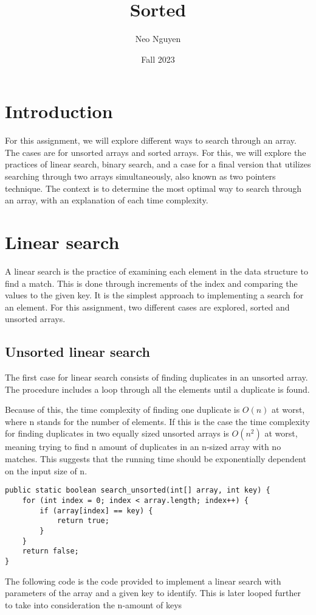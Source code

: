 \documentclass[a4paper,11pt]{article}
\begin{document}
\title{
    \textbf{Sorted}
}
\author{Neo Nguyen}
\date{Fall 2023}

\maketitle

\section*{Introduction}

    For this assignment, we will explore different ways to search through an array. The cases are for unsorted arrays and sorted arrays. For this, we will explore the practices of linear search, binary search, and a case for a final version that utilizes searching through two arrays simultaneously, also known as two pointers technique. The context is to determine the most optimal way to search through an array, with an explanation of each time complexity.

\section*{Linear search}

    A linear search is the practice of examining each element in the data structure to find a match. This is done through increments of the index and comparing the values to the given key. It is the simplest approach to implementing a search for an element. For this assignment, two different cases are explored, sorted and unsorted arrays.

    \subsection*{Unsorted linear search}

        The first case for linear search consists of finding duplicates in an unsorted array. The procedure includes a loop through all the elements until a duplicate is found. 
        
        Because of this, the time complexity of finding one duplicate is $O(n)$ at worst, where n stands for the number of elements. If this is the case the time complexity for finding duplicates in two equally sized unsorted arrays is $O(n^2)$ at worst, meaning trying to find n amount of duplicates in an n-sized array with no matches. This suggests that the running time should be exponentially dependent on the input size of n.
\begin{verbatim}
public static boolean search_unsorted(int[] array, int key) {
    for (int index = 0; index < array.length; index++) {
        if (array[index] == key) {
            return true;
        }
    }
    return false;
}
\end{verbatim}
        The following code is the code provided to implement a linear search with parameters of the array and a given key to identify. This is later looped further to take into consideration the n-amount of keys 
\end{document}
